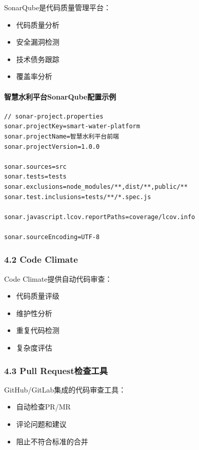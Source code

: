 SonarQube是代码质量管理平台：

\begin{itemize}
\tightlist
\item
  代码质量分析
\item
  安全漏洞检测
\item
  技术债务跟踪
\item
  覆盖率分析
\end{itemize}

\paragraph{智慧水利平台SonarQube配置示例}\label{ux667aux6167ux6c34ux5229ux5e73ux53f0sonarqubeux914dux7f6eux793aux4f8b}

\begin{lstlisting}
// sonar-project.properties
sonar.projectKey=smart-water-platform
sonar.projectName=智慧水利平台前端
sonar.projectVersion=1.0.0

sonar.sources=src
sonar.tests=tests
sonar.exclusions=node_modules/**,dist/**,public/**
sonar.test.inclusions=tests/**/*.spec.js

sonar.javascript.lcov.reportPaths=coverage/lcov.info

sonar.sourceEncoding=UTF-8
\end{lstlisting}

\subsubsection{4.2 Code Climate}\label{code-climate}

Code Climate提供自动代码审查：

\begin{itemize}
\tightlist
\item
  代码质量评级
\item
  维护性分析
\item
  重复代码检测
\item
  复杂度评估
\end{itemize}

\subsubsection{4.3 Pull
Request检查工具}\label{pull-requestux68c0ux67e5ux5de5ux5177}

GitHub/GitLab集成的代码审查工具：

\begin{itemize}
\tightlist
\item
  自动检查PR/MR
\item
  评论问题和建议
\item
  阻止不符合标准的合并
\end{itemize}

